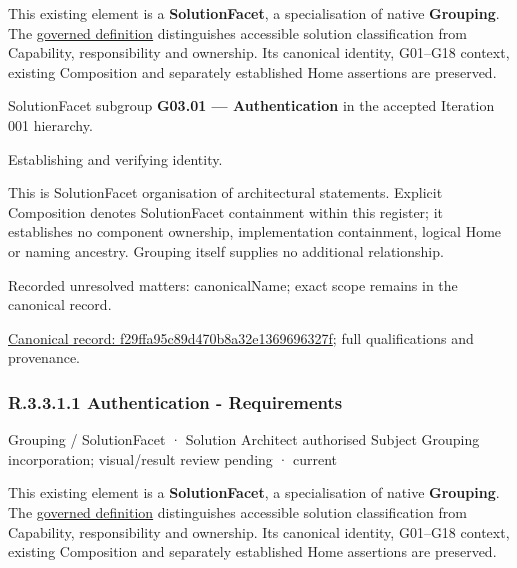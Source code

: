 This existing element is a \textbf{SolutionFacet}, a specialisation of native
\textbf{Grouping}. The \href{\detokenize{../../../../../../../governance/continuum-representation.md#solutionfacet-classification--1119-candidate}}{governed definition}
distinguishes accessible solution classification from Capability, responsibility
and ownership. Its canonical identity, G01–G18 context, existing Composition
and separately established Home assertions are preserved.



SolutionFacet subgroup \textbf{G03.01 — Authentication} in the accepted Iteration 001 hierarchy.



Establishing and verifying identity.



This is SolutionFacet organisation of architectural statements. Explicit Composition denotes SolutionFacet containment within this register; it establishes no component ownership, implementation containment, logical Home or naming ancestry. Grouping itself supplies no additional relationship.


{\small Recorded unresolved matters: canonicalName; exact scope remains in the canonical record.}\par
{\footnotesize \href{../../../../../../../continuum/grouping/f29ffa95c89d470b8a32e1369696327f.md}{Canonical record: f29ffa95c89d470b8a32e1369696327f}; full qualifications and provenance.}\par
\subsubsection*{R.3.3.1.1 Authentication - Requirements}
\label{navigation:R.3.3.1.1}

\label{element:395d77eea25d40b0b74321dc7aabd283}
{\small Grouping / SolutionFacet · Solution Architect authorised Subject Grouping incorporation; visual/result review pending · current}\par

This existing element is a \textbf{SolutionFacet}, a specialisation of native
\textbf{Grouping}. The \href{\detokenize{../../../../../../../governance/continuum-representation.md#solutionfacet-classification--1119-candidate}}{governed definition}
distinguishes accessible solution classification from Capability, responsibility
and ownership. Its canonical identity, G01–G18 context, existing Composition
and separately established Home assertions are preserved.



